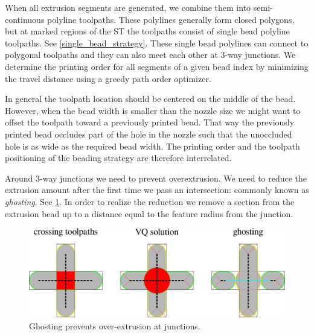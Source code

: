 When all extrusion segments are generated, we combine them into semi-continuous polyline toolpaths.
These polylines generally form closed polygons, but at marked regions of the ST the toolpaths consist of single bead polyline toolpaths.
See \cref{single_bead_strategy}.
These single bead polylines can connect to polygonal toolpaths and they can also meet each other at 3-way junctions.
We determine the printing order for all segments of a given bead index by minimizing the travel distance using a greedy path order optimizer.


In general the toolpath location should be centered on the middle of the bead.
However, when the bead width is smaller than the nozzle size we might want to offset the toolpath toward a previously printed bead.
That way the previously printed bead occludes part of the hole in the nozzle such that the unoccluded hole is as wide as the required bead width.
The printing order and the toolpath positioning of the beading strategy are therefore interrelated.

Around 3-way junctions we need to prevent overextrusion.
We need to reduce the extrusion amount after the first time we pass an intersection: commonly known as \emph{ghosting}.
See \cref{ghosting}.
In order to realize the reduction we remove a section from the extrusion bead up to a distance equal to the feature radius from the junction.


\begin{figure}
\centering
\includegraphics[width=.99\columnwidth]{sources/method/ghosting.pdf}
\caption{Ghosting prevents over-extrusion at junctions.}
\label{ghosting}
\end{figure}


























































